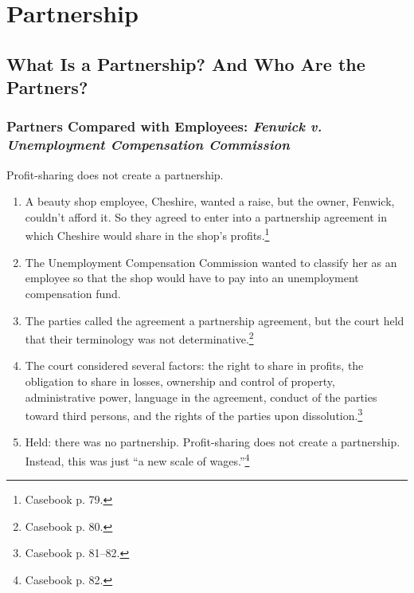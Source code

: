 \section{Partnership}

\subsection{What Is a Partnership? And Who Are the Partners?}

\subsubsection{Partners Compared with Employees: \emph{Fenwick v. Unemployment 
Compensation Commission}}

Profit-sharing does not create a partnership.

\begin{enumerate}
    \item A beauty shop employee, Cheshire, wanted a raise, but the owner, 
    Fenwick, couldn't afford it. So they agreed to enter into a partnership 
    agreement in which Cheshire would share in the shop's 
    profits.\footnote{Casebook p. 79.}
    \item The Unemployment Compensation Commission wanted to classify her as 
    an employee so that the shop would have to pay into an unemployment 
    compensation fund.
    \item The parties called the agreement a partnership agreement, but the 
    court held that their terminology was not determinative.\footnote{Casebook 
    p. 80.}
    \item The court considered several factors: the right to share in profits, 
    the obligation to share in losses, ownership and control of property, 
    administrative power, language in the agreement, conduct of the parties 
    toward third persons, and the rights of the parties upon 
    dissolution.\footnote{Casebook p. 81--82.}
    \item Held: there was no partnership. Profit-sharing does not create a 
    partnership. Instead, this was just ``a new scale of 
    wages.''\footnote{Casebook p. 82.}
\end{enumerate}

